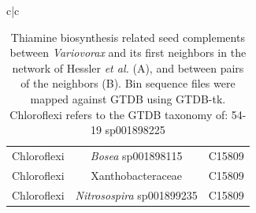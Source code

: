 \documentclass[sn-mathphys,Numbered]{sn-jnl}  %
\theoremstyle{thmstyleone}%
\theoremstyle{thmstyletwo}%
\theoremstyle{thmstylethree}%
\begin{document}
\begin{table}[ht]
\begin{minipage}{\linewidth}
\begin{adjustbox}{width=1.3\textwidth,center=\textwidth}
\begin{tabular}{c|c}
\begin{tabular}{ccc}
                            Chloroflexi & \textit{Bosea} sp001898115 & C15809 \\
                            Chloroflexi & Xanthobacteraceae & C15809 \\
                            Chloroflexi & \textit{Nitrosospira} sp001899235 & C15809 \\
                        \end{tabular} \\
                    \end{tabular} \\
                \end{adjustbox}
            \caption{ 
                Thiamine biosynthesis related seed complements between \textit{Variovorax} and its first neighbors in the network of Hessler \textit{et al.}\cite{hessler2023vitamin} (A), and between pairs of the neighbors (B).
                Bin sequence files were mapped against GTDB using GTDB-tk. 
                Chloroflexi refers to the GTDB taxonomy of: 54-19 sp001898225
            }
            \label{tab:Variovorax}
            \end{minipage}
            \end{table}
    
    




\end{document}
